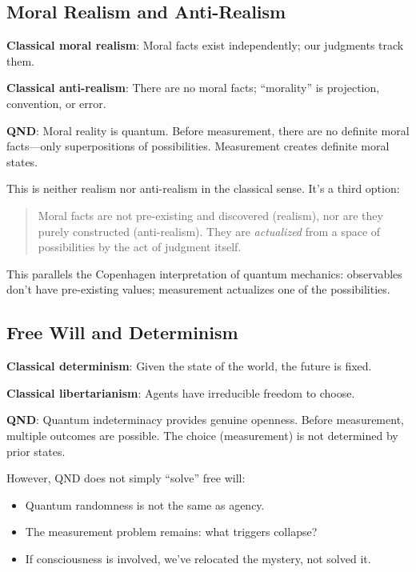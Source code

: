 \documentclass[12pt]{article}
\begin{document}
\subsection{Moral Realism and Anti-Realism}

\textbf{Classical moral realism}: Moral facts exist independently; our judgments track them.

\textbf{Classical anti-realism}: There are no moral facts; ``morality'' is projection, convention, or error.

\textbf{QND}: Moral reality is quantum. Before measurement, there are no definite moral facts---only superpositions of possibilities. Measurement creates definite moral states.

This is neither realism nor anti-realism in the classical sense. It's a third option:

\begin{quote}
Moral facts are not pre-existing and discovered (realism), nor are they purely constructed (anti-realism). They are \emph{actualized} from a space of possibilities by the act of judgment itself.
\end{quote}

This parallels the Copenhagen interpretation of quantum mechanics: observables don't have pre-existing values; measurement actualizes one of the possibilities.

\subsection{Free Will and Determinism}

\textbf{Classical determinism}: Given the state of the world, the future is fixed.

\textbf{Classical libertarianism}: Agents have irreducible freedom to choose.

\textbf{QND}: Quantum indeterminacy provides genuine openness. Before measurement, multiple outcomes are possible. The choice (measurement) is not determined by prior states.

However, QND does not simply ``solve'' free will:
\begin{itemize}
    \item Quantum randomness is not the same as agency.
    \item The measurement problem remains: what triggers collapse?
    \item If consciousness is involved, we've relocated the mystery, not solved it.
\end{itemize}
\end{document}
